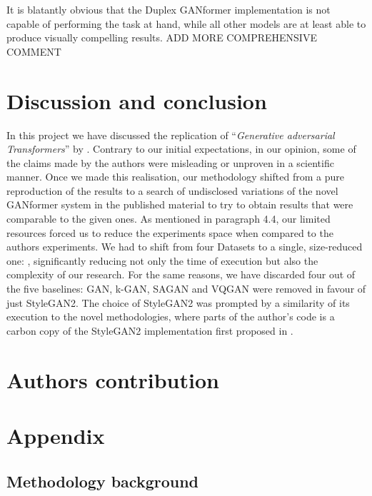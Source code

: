 \documentclass{article}
\begin{document}
    
	It is blatantly obvious that the Duplex GANformer implementation is not capable of performing the task at hand, while all other models are at least able to produce visually compelling results.
	ADD MORE COMPREHENSIVE COMMENT
	\clearpage
	
	
	\section{Discussion and conclusion}%

	In this project we have discussed the replication of ``\emph{Generative adversarial Transformers}'' 
	by \citet{hudson2021generative}.
	Contrary to our initial expectations, in our opinion, some of the claims made by the authors were misleading or unproven in a scientific manner.
	Once we made this realisation, our methodology shifted from a pure reproduction of the results to a 
	search of undisclosed variations of the novel GANformer system in the published material to try to 
	obtain results that were comparable to the given ones.
	As mentioned in paragraph 4.4, our limited resources forced us to reduce the experiments space when compared to the authors experiments.
	We had to shift from four Datasets to a single, size-reduced one: \citet{cartoonset}, significantly reducing not only the time of execution but also the complexity of our research.
	For the same reasons, we have discarded four out of the five baselines: GAN, k-GAN, SAGAN and VQGAN were removed in favour of just StyleGAN2.
	The choice of StyleGAN2 was prompted by a similarity of its execution to the novel methodologies, where parts of the author's code is a carbon copy of the StyleGAN2 implementation first proposed in \citet{karras2019style}.
	
	\section{Authors contribution}

	\clearpage
	\appendix
	\section{Appendix}\label{sec:appendix}
	
	\subsection{Methodology background} \label{subsec:app_background}
	
\end{document}
